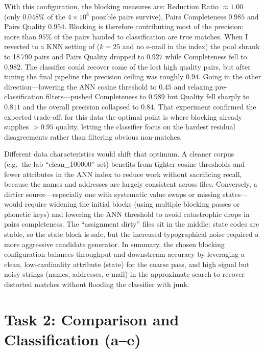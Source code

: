 \documentclass[11pt]{article}
\begin{document}
With this configuration, the blocking measures are: Reduction Ratio $\approx 1.00$ (only $0.048\%$ of the $4 \times 10^{8}$ possible pairs survive), Pairs Completeness $0.985$ and Pairs Quality $0.954$. Blocking is therefore contributing most of the precision: more than $95\%$ of the pairs handed to classification are true matches. When I reverted to a KNN setting of ($k{=}25$ and no e-mail in the index) the pool shrank to 18\,790 pairs and Pairs Quality dropped to $0.927$ while Completeness fell to $0.982$. The classifier could recover some of the lost high quality pairs, but after tuning the final pipeline the precision ceiling was roughly $0.94$. Going in the other direction---lowering the ANN cosine threshold to $0.45$ and relaxing pre-classification filters---pushed Completeness to $0.989$ but Quality fell sharply to $0.811$ and the overall precision collapsed to $0.84$. That experiment confirmed the expected trade-off: for this data the optimal point is where blocking already supplies $>0.95$ quality, letting the classifier focus on the hardest residual disagreements rather than filtering obvious non-matches.

Different data characteristics would shift that optimum. A cleaner corpus (e.g.\ the lab ``clean\_100000'' set) benefits from tighter cosine thresholds and fewer attributes in the ANN index to reduce work without sacrificing recall, because the names and addresses are largely consistent across files. Conversely, a dirtier source---especially one with systematic value swaps or missing states---would require widening the initial blocks (using multiple blocking passes or phonetic keys) and lowering the ANN threshold to avoid catastrophic drops in pairs completeness. The ``assignment dirty'' files sit in the middle: state codes are stable, so the state block is safe, but the increased typographical noise required a more aggressive candidate generator. In summary, the chosen blocking configuration balances throughput and downstream accuracy by leveraging a clean, low-cardinality attribute (state) for the coarse pass, and high signal but noisy strings (names, addresses, e-mail) in the approximate search to recover distorted matches without flooding the classifier with junk.

\section*{Task 2: Comparison and Classification (a--e)}
\end{document}
